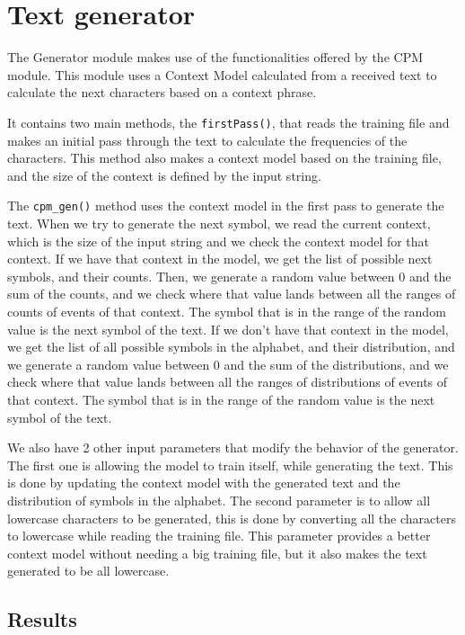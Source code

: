 \documentclass{article}
\begin{document}
\section{Text generator}
\label{sec:text-generator}

The Generator module makes use of the functionalities offered by the CPM module.
This module uses a Context Model calculated from a received text to calculate the
next characters based on a context phrase. 

It contains two main methods, the \verb|firstPass()|, that reads the training file and makes an initial pass through the text to calculate the frequencies of the characters.
This method also makes a context model based on the training file, and the size of the context is defined by the input string. 

The \verb|cpm_gen()| method uses the context model in the first pass to generate the text.
When we try to generate the next symbol, we read the current context, which is the size of the input string and we check the context model for that context. If we have that context in the model, we get the list of possible next symbols, and their counts. Then, we generate a random value between 0 and the sum of the counts, and we check where that value lands between all the ranges of counts of events of that context. The symbol that is in the range of the random value is the next symbol of the text.
If we don't have that context in the model, we get the list of all possible symbols in the alphabet, and their distribution, and we generate a random value between 0 and the sum of the distributions, and we check where that value lands between all the ranges of distributions of events of that context. The symbol that is in the range of the random value is the next symbol of the text. 

We also have 2 other input parameters that modify the behavior of the generator. The first one is allowing the model to train itself, while generating the text. This is done by updating the context model with the generated text and the distribution of symbols in the alphabet.
The second parameter is to allow all lowercase characters to be generated, this is done by converting all the characters to lowercase while reading the training file. This parameter provides a better context model without needing a big training file, but it also makes the text generated to be all lowercase.


\subsection{Results}
\end{document}
